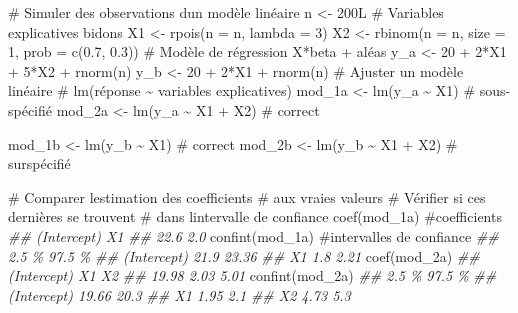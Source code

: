 \documentclass[
  11pt,
  letterpaper,
]{book}
\newenvironment{Shaded}{\begin{snugshade}}{\end{snugshade}}
\newcommand{\AttributeTok}[1]{\textcolor[rgb]{0.40,0.45,0.13}{#1}}
\newcommand{\CommentTok}[1]{\textcolor[rgb]{0.37,0.37,0.37}{#1}}
\newcommand{\DecValTok}[1]{\textcolor[rgb]{0.68,0.00,0.00}{#1}}
\newcommand{\DocumentationTok}[1]{\textcolor[rgb]{0.37,0.37,0.37}{\textit{#1}}}
\newcommand{\FloatTok}[1]{\textcolor[rgb]{0.68,0.00,0.00}{#1}}
\newcommand{\FunctionTok}[1]{\textcolor[rgb]{0.28,0.35,0.67}{#1}}
\newcommand{\NormalTok}[1]{\textcolor[rgb]{0.00,0.23,0.31}{#1}}
\newcommand{\OtherTok}[1]{\textcolor[rgb]{0.00,0.23,0.31}{#1}}
\newcommand{\SpecialCharTok}[1]{\textcolor[rgb]{0.37,0.37,0.37}{#1}}
\theoremstyle{definition}
\theoremstyle{remark}
\begin{document}
\begin{Shaded}
\begin{Highlighting}[]
\CommentTok{\# Simuler des observations d\textquotesingle{}un modèle linéaire}
\NormalTok{n }\OtherTok{\textless{}{-}}\NormalTok{ 200L}
\CommentTok{\# Variables explicatives bidons}
\NormalTok{X1 }\OtherTok{\textless{}{-}} \FunctionTok{rpois}\NormalTok{(}\AttributeTok{n =}\NormalTok{ n, }\AttributeTok{lambda =} \DecValTok{3}\NormalTok{)}
\NormalTok{X2 }\OtherTok{\textless{}{-}} \FunctionTok{rbinom}\NormalTok{(}\AttributeTok{n =}\NormalTok{ n, }\AttributeTok{size =} \DecValTok{1}\NormalTok{, }\AttributeTok{prob =} \FunctionTok{c}\NormalTok{(}\FloatTok{0.7}\NormalTok{, }\FloatTok{0.3}\NormalTok{))}
\CommentTok{\# Modèle de régression X*beta + aléas}
\NormalTok{y\_a }\OtherTok{\textless{}{-}} \DecValTok{20} \SpecialCharTok{+} \DecValTok{2}\SpecialCharTok{*}\NormalTok{X1 }\SpecialCharTok{+} \DecValTok{5}\SpecialCharTok{*}\NormalTok{X2 }\SpecialCharTok{+} \FunctionTok{rnorm}\NormalTok{(n)}
\NormalTok{y\_b }\OtherTok{\textless{}{-}} \DecValTok{20} \SpecialCharTok{+} \DecValTok{2}\SpecialCharTok{*}\NormalTok{X1 }\SpecialCharTok{+} \FunctionTok{rnorm}\NormalTok{(n)}
\CommentTok{\# Ajuster un modèle linéaire}
\CommentTok{\# lm(réponse \textasciitilde{} variables explicatives)}
\NormalTok{mod\_1a }\OtherTok{\textless{}{-}} \FunctionTok{lm}\NormalTok{(y\_a }\SpecialCharTok{\textasciitilde{}}\NormalTok{ X1) }\CommentTok{\# sous{-}spécifié}
\NormalTok{mod\_2a }\OtherTok{\textless{}{-}} \FunctionTok{lm}\NormalTok{(y\_a }\SpecialCharTok{\textasciitilde{}}\NormalTok{ X1 }\SpecialCharTok{+}\NormalTok{ X2) }\CommentTok{\# correct}

\NormalTok{mod\_1b }\OtherTok{\textless{}{-}} \FunctionTok{lm}\NormalTok{(y\_b }\SpecialCharTok{\textasciitilde{}}\NormalTok{ X1) }\CommentTok{\# correct}
\NormalTok{mod\_2b }\OtherTok{\textless{}{-}} \FunctionTok{lm}\NormalTok{(y\_b }\SpecialCharTok{\textasciitilde{}}\NormalTok{ X1 }\SpecialCharTok{+}\NormalTok{ X2) }\CommentTok{\# surspécifié}

\CommentTok{\# Comparer l\textquotesingle{}estimation des coefficients}
\CommentTok{\#  aux vraies valeurs}
\CommentTok{\# Vérifier si ces dernières se trouvent}
\CommentTok{\#  dans l\textquotesingle{}intervalle de confiance}
\FunctionTok{coef}\NormalTok{(mod\_1a) }\CommentTok{\#coefficients}
\DocumentationTok{\#\# (Intercept)          X1 }
\DocumentationTok{\#\#        22.6         2.0}
\FunctionTok{confint}\NormalTok{(mod\_1a) }\CommentTok{\#intervalles de confiance}
\DocumentationTok{\#\#             2.5 \% 97.5 \%}
\DocumentationTok{\#\# (Intercept)  21.9  23.36}
\DocumentationTok{\#\# X1            1.8   2.21}
\FunctionTok{coef}\NormalTok{(mod\_2a)}
\DocumentationTok{\#\# (Intercept)          X1          X2 }
\DocumentationTok{\#\#       19.98        2.03        5.01}
\FunctionTok{confint}\NormalTok{(mod\_2a)}
\DocumentationTok{\#\#             2.5 \% 97.5 \%}
\DocumentationTok{\#\# (Intercept) 19.66   20.3}
\DocumentationTok{\#\# X1           1.95    2.1}
\DocumentationTok{\#\# X2           4.73    5.3}
\end{Highlighting}
\end{Shaded}
\end{document}
